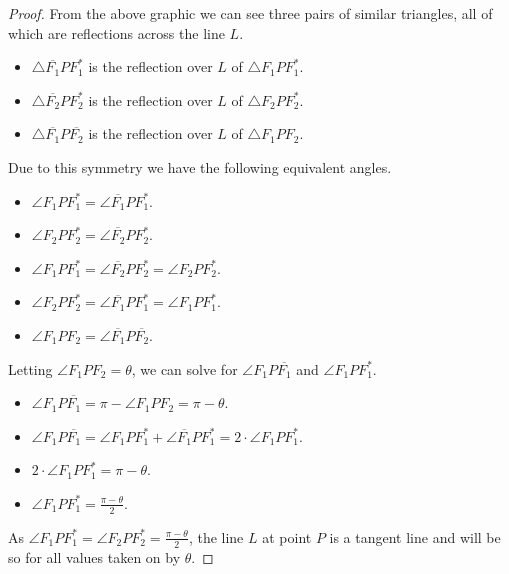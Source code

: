 \documentclass[12pt]{article}
\newcommand{\ds}{\displaystyle}
\theoremstyle{plain}
\begin{document}
\begin{proof}
  From the above graphic we can see three pairs of similar triangles, all of which are reflections across the line $ L $. 

  \begin{itemize}
    \item $ \ds \triangle \overline{F_{1}}PF_{1}^{*} $ is the reflection over $ L $ of $ \ds \triangle F_{1}PF_{1}^{*} $.
    \item $ \ds \triangle \overline{F_{2}}PF_{2}^{*} $ is the reflection over $ L $ of $ \ds \triangle F_{2}PF_{2}^{*} $.
    \item $ \ds \triangle \overline{F_{1}}P\overline{F_{2}} $ is the reflection over $ L $ of $ \ds \triangle F_{1}PF_{2} $.
  \end{itemize}

  Due to this symmetry we have the following equivalent angles. 

  \begin{itemize}
    \item $ \ds \angle F_{1}PF_{1}^{*} = \angle \overline{F_{1}}PF_{1}^{*} $.
    \item $ \ds \angle F_{2}PF_{2}^{*} = \angle \overline{F_{2}}PF_{2}^{*} $.
    \item $ \ds \angle F_{1}PF_{1}^{*} = \angle \overline{F_{2}}PF_{2}^{*} = \angle F_{2}PF_{2}^{*} $.
    \item $ \ds \angle F_{2}PF_{2}^{*} = \angle \overline{F_{1}}PF_{1}^{*} = \angle F_{1}PF_{1}^{*} $.
    \item $ \ds \angle F_{1}PF_{2} = \angle \overline{F_{1}}P\overline{F_{2}} $.
  \end{itemize}

  Letting $ \ds \angle F_{1}PF_{2} = \theta $, we can solve for $ \ds \angle F_{1}P\overline{F_{1}} $ and $ \ds \angle F_{1}PF_{1}^{*} $.

  \begin{itemize}
    \item $ \ds \angle F_{1}P\overline{F_{1}} = \pi - \angle F_{1}PF_{2} = \pi - \theta $.
    \item $ \ds \angle F_{1}P\overline{F_{1}} = \angle F_{1}PF_{1}^{*} + \angle \overline{F_{1}}PF_{1}^{*} = 2 \cdot \angle F_{1}PF_{1}^{*} $.
    \item $ \ds 2 \cdot \angle F_{1}PF_{1}^{*} = \pi - \theta  $.
    \item $ \ds \angle F_{1}PF_{1}^{*} = \frac{\pi - \theta}{2} $.
  \end{itemize}

  As $ \ds \angle F_{1}PF_{1}^{*} = \angle F_{2}PF_{2}^{*} = \frac{\pi - \theta}{2} $, the line $ L $ at point $ P $ is a tangent line and will be so for all values taken on by $ \theta $. 


\end{proof}
\end{document}
